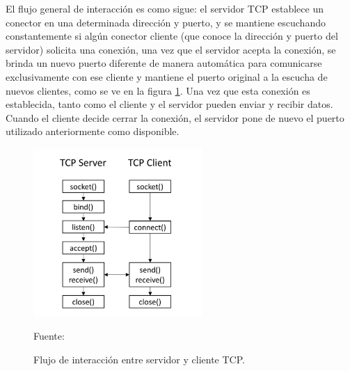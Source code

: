 

El flujo general de interacción es como sigue: el servidor TCP establece un conector en una determinada dirección y puerto, y se mantiene escuchando constantemente si algún conector cliente (que conoce la dirección y puerto del servidor) solicita una conexión, una vez que el servidor acepta la conexión, se brinda un nuevo puerto diferente de manera automática para comunicarse exclusivamente con ese cliente y mantiene el puerto original a la escucha de nuevos clientes, como se ve en la figura \ref{fig:tcp_flow}. Una vez que esta conexión es establecida, tanto como el cliente y el servidor pueden enviar y recibir datos. Cuando el cliente decide cerrar la conexión, el servidor pone de nuevo el puerto utilizado anteriormente como disponible.\\

\begin{figure}[H]
    \begin{center}
        \includegraphics[width=6.4cm]{img/capitulo_2/tcp.png}
        \caption{Flujo de interacción entre servidor y cliente TCP.\\}
        Fuente: \cite{tcpsocket}
        \label{fig:tcp_flow}
    \end{center}
\end{figure}


